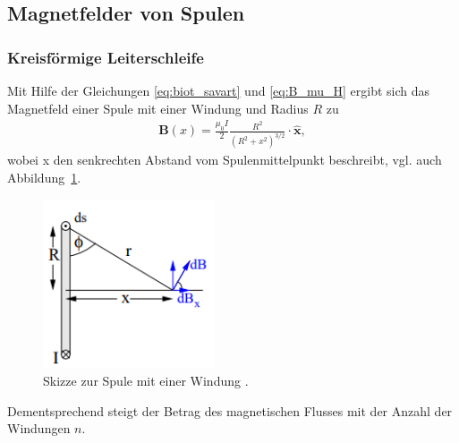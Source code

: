 \subsection{Magnetfelder von Spulen}
\label{sec:magnetfelder_von_spulen}

\subsubsection{Kreisförmige Leiterschleife}
Mit Hilfe der Gleichungen \eqref{eq:biot_savart} und \eqref{eq:B_mu_H} ergibt sich das Magnetfeld einer Spule mit einer Windung und Radius $R$ zu
\begin{align}
    \symbf{B}(x) = \frac{\mu_0 I}{2} \frac{R^2}{\left(R^2 + x^2\right)^{3/2}} \cdot \hat{\symbf{x}},
\end{align}
wobei x den senkrechten Abstand vom Spulenmittelpunkt beschreibt, vgl. auch Abbildung~\ref{fig:spule_eine_Windung}.
%
\begin{figure}[H]
    \centering
    \includegraphics*[height = 5cm]{./abbildungen/spule_eine_windung.png}
    \caption[]{Skizze zur Spule mit einer Windung \cite{man:v308}.}
    \label{fig:spule_eine_Windung}
\end{figure}
\noindent
Dementsprechend steigt der Betrag des magnetischen Flusses mit der Anzahl der Windungen $n$.


